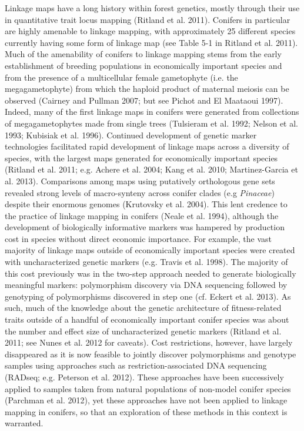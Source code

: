 \documentclass[11pt]{article}
\begin{document}
Linkage maps have a long history within forest genetics, mostly through their use in quantitative trait locus
mapping (Ritland et al. 2011). Conifers in particular are highly amenable to linkage mapping, with approximately
25 different species currently having some form of linkage map (see Table 5-1 in Ritland et al. 2011). Much of the amenability of
conifers to linkage mapping stems from the early establishment of breeding populations in 
economically important species and from the presence of a 
multicellular female gametophyte (i.e. the megagametophyte) from which the haploid product of maternal 
meiosis can be observed (Cairney and Pullman 2007;
but see Pichot and El Maataoui 1997). Indeed, many of the first linkage maps in conifers were generated from collections of 
megagametophytes made from single trees (Tulsieram et al. 1992; Nelson et al. 1993; Kubisiak et al. 1996).
Continued development of genetic marker technologies facilitated rapid development of linkage maps across a diversity of species, with 
the largest maps generated for economically important species 
(Ritland et al. 2011; e.g. Achere et al. 2004; Kang et al. 2010; Martinez-Garcia et al. 2013). 
Comparisons among maps using putatively orthologous gene
sets revealed strong levels of macro-synteny across conifer clades (e.g \textit{Pinaceae}) 
despite their enormous genomes (Krutovsky et al. 2004). This lent credence to 
the practice of linkage mapping in conifers (Neale et al. 1994), although the development of biologically 
informative markers was hampered by production cost in species without direct 
economic importance. For example, the vast majority of linkage maps outside of economically important species were
created with uncharacterized genetic markers (e.g. Travis et al. 1998). 
The majority of this cost previously was in the two-step approach needed to generate
biologically meaningful markers: polymorphism discovery via DNA sequencing followed by 
genotyping of polymorphisms discovered in step one (cf. Eckert et al. 2013). 
As such, much of the knowledge about the genetic architecture of fitness-related traits outside of a
handful of economically important conifer species was about the number and effect size of uncharacterized 
genetic markers (Ritland et al. 2011; see Nunes et al. 2012 for caveats). 
Cost restrictions, however, have largely disappeared as it is now feasible to jointly discover 
polymorphisms and genotype samples using approaches such as restriction-associated
DNA sequencing (RADseq; e.g. Peterson et al. 2012). These approaches have been successively applied 
to samples taken from natural populations of non-model conifer species (Parchman et al. 2012), 
yet these approaches have not been applied to linkage mapping in conifers, 
so that an exploration of these methods in this context is warranted.
\end{document}

